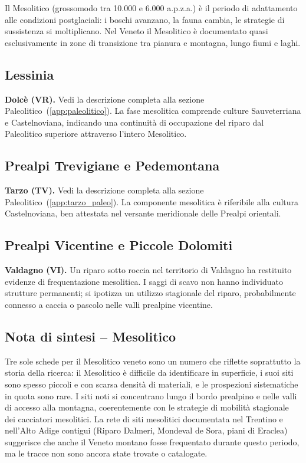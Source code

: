 Il Mesolitico (grossomodo tra 10.000 e 6.000 a.p.z.a.) è il periodo di adattamento alle condizioni postglaciali: i boschi avanzano, la fauna cambia, le strategie di sussistenza si moltiplicano. Nel Veneto il Mesolitico è documentato quasi esclusivamente in zone di transizione tra pianura e montagna, lungo fiumi e laghi.

\subsection{Lessinia}

\textbf{Dolcè (VR).} Vedi la descrizione completa alla sezione Paleolitico~(\ref{app:paleolitico}). La fase mesolitica comprende culture Sauveterriana e Castelnoviana, indicando una continuità di occupazione del riparo dal Paleolitico superiore attraverso l'intero Mesolitico.

\subsection{Prealpi Trevigiane e Pedemontana}

\textbf{Tarzo (TV).} Vedi la descrizione completa alla sezione Paleolitico~(\ref{app:tarzo_paleo}). La componente mesolitica è riferibile alla cultura Castelnoviana, ben attestata nel versante meridionale delle Prealpi orientali.

\subsection{Prealpi Vicentine e Piccole Dolomiti}

\textbf{Valdagno (VI).} Un riparo sotto roccia nel territorio di Valdagno ha restituito evidenze di frequentazione mesolitica. I saggi di scavo non hanno individuato strutture permanenti; si ipotizza un utilizzo stagionale del riparo, probabilmente connesso a caccia o pascolo nelle valli prealpine vicentine.

\subsection*{Nota di sintesi -- Mesolitico}

Tre sole schede per il Mesolitico veneto sono un numero che riflette soprattutto la storia della ricerca: il Mesolitico è difficile da identificare in superficie, i suoi siti sono spesso piccoli e con scarsa densità di materiali, e le prospezioni sistematiche in quota sono rare. I siti noti si concentrano lungo il bordo prealpino e nelle valli di accesso alla montagna, coerentemente con le strategie di mobilità stagionale dei cacciatori mesolitici. La rete di siti mesolitici documentata nel Trentino e nell'Alto Adige contigui (Riparo Dalmeri, Mondeval de Sora, piani di Eraclea) suggerisce che anche il Veneto montano fosse frequentato durante questo periodo, ma le tracce non sono ancora state trovate o catalogate.

